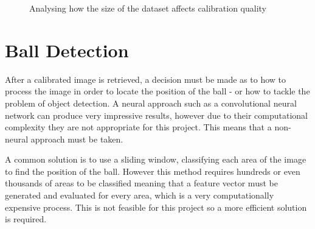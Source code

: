 \begin{figure}[H]
    \centering
    \caption{Analysing how the size of the dataset affects calibration quality}
    \label{fig:camera calibration}
\end{figure}

\section{Ball Detection}

After a calibrated image is retrieved, a decision must be made as to how to process the image in order to locate the position of the ball - or how to tackle the problem of object detection. A neural approach such as a convolutional neural network can produce very impressive results, however due to their computational complexity they are not appropriate for this project. This means that a non-neural approach must be taken. 

A common solution is to use a sliding window, classifying each area of the image to find the position of the ball. However this method requires hundreds or even thousands of areas to be classified meaning that a feature vector must be generated and evaluated for every area, which is a very computationally expensive process. This is not feasible for this project so a more efficient solution is required.

